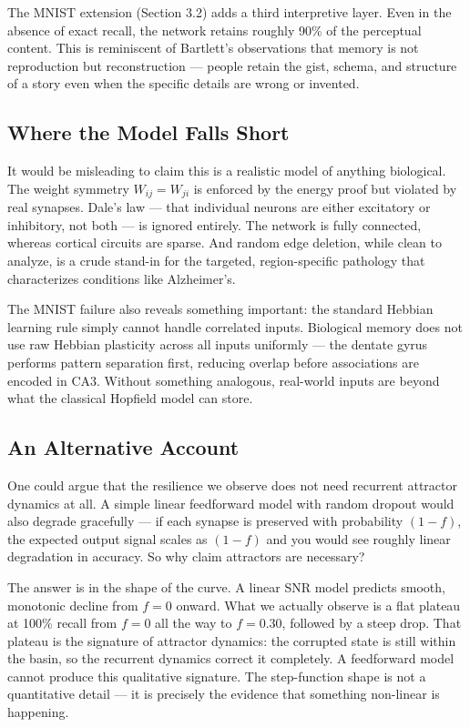 \documentclass[11pt,a4paper]{article}
\begin{document}
The MNIST extension (Section 3.2) adds a third interpretive layer. Even in the absence of exact recall, the network retains roughly 90\% of the perceptual content. This is reminiscent of Bartlett's \cite{bartlett1932} observations that memory is not reproduction but reconstruction --- people retain the gist, schema, and structure of a story even when the specific details are wrong or invented.

\subsection{Where the Model Falls Short}

It would be misleading to claim this is a realistic model of anything biological. The weight symmetry $W_{ij} = W_{ji}$ is enforced by the energy proof but violated by real synapses. Dale's law --- that individual neurons are either excitatory or inhibitory, not both --- is ignored entirely. The network is fully connected, whereas cortical circuits are sparse. And random edge deletion, while clean to analyze, is a crude stand-in for the targeted, region-specific pathology that characterizes conditions like Alzheimer's.

The MNIST failure also reveals something important: the standard Hebbian learning rule simply cannot handle correlated inputs. Biological memory does not use raw Hebbian plasticity across all inputs uniformly --- the dentate gyrus performs pattern separation first, reducing overlap before associations are encoded in CA3. Without something analogous, real-world inputs are beyond what the classical Hopfield model can store.

\subsection{An Alternative Account}

One could argue that the resilience we observe does not need recurrent attractor dynamics at all. A simple linear feedforward model with random dropout would also degrade gracefully --- if each synapse is preserved with probability $(1-f)$, the expected output signal scales as $(1-f)$ and you would see roughly linear degradation in accuracy. So why claim attractors are necessary?

The answer is in the shape of the curve. A linear SNR model predicts smooth, monotonic decline from $f=0$ onward. What we actually observe is a flat plateau at 100\% recall from $f=0$ all the way to $f=0.30$, followed by a steep drop. That plateau is the signature of attractor dynamics: the corrupted state is still within the basin, so the recurrent dynamics correct it completely. A feedforward model cannot produce this qualitative signature. The step-function shape is not a quantitative detail --- it is precisely the evidence that something non-linear is happening.
\end{document}
